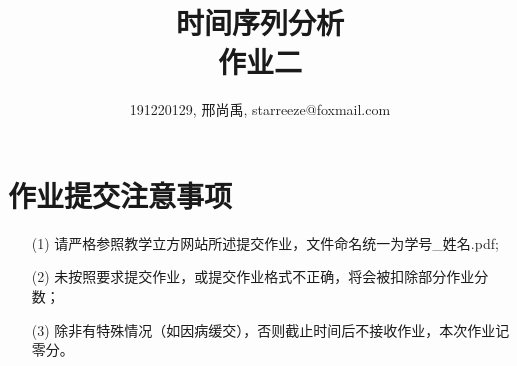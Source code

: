 \documentclass[a4paper,UTF8]{article}
\numberwithin{equation}{section}
\begin{document}
\title{时间序列分析\\
作业二}
\author{191220129, 邢尚禹, starreeze@foxmail.com}
\maketitle

\section*{作业提交注意事项}
\begin{tcolorbox}
\begin{enumerate}
  \item[(1)] 请严格参照教学立方网站所述提交作业，文件命名统一为{\color{red}学号\_姓名.pdf};
  \item[(2)] 未按照要求提交作业，或提交作业格式不正确，将会被扣除部分作业分数；
  \item[(3)] 除非有特殊情况（如因病缓交），否则截止时间后不接收作业，本次作业记零分。
\end{enumerate}
\end{tcolorbox}
\end{document}
